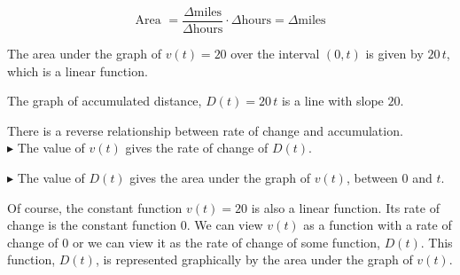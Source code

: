 \documentclass{ximera}
\begin{document}
\[
\text{Area } = \frac{\Delta \text{miles}}{\Delta \text{hours}} \cdot \Delta \text{hours} = \Delta \text{miles}
\]


The area under the graph of $v(t) = 20$ over the interval $(0, t)$ is given by $20 \, t$, which is a linear function.






The graph of accumulated distance, $D(t) = 20 \, t$ is a line with slope $20$.




\begin{image}
\end{image}
There is a reverse relationship between rate of change and accumulation. \\


$\blacktriangleright$ The value of $v(t)$ gives the rate of change of $D(t)$.


$\blacktriangleright$ The value of $D(t)$ gives the area under the graph of $v(t)$, between $0$ and $t$.






Of course, the constant function $v(t) = 20$ is also a linear function. Its rate of change is the constant function $0$.  We can view $v(t)$ as a function with a rate of change of $0$ or we can view it as the rate of change of some function, $D(t)$. This function, $D(t)$, is represented graphically by the area under the graph of $v(t)$.
\end{document}
